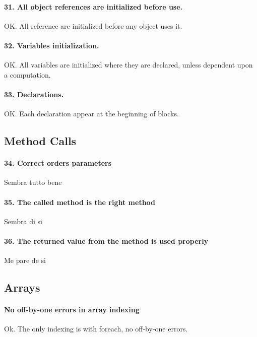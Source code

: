 \documentclass[english]{article}
\begin{document}
\paragraph{31. All object references are initialized before use.} 
OK. All reference are initialized before any object uses it. 

\paragraph{32. Variables initialization.} 
OK. All variables are initialized where they are declared, unless dependent upon a computation.

\paragraph{33. Declarations.} OK. Each declaration appear at the beginning of blocks.

\subsection{Method Calls}

\paragraph{34. Correct orders parameters}

Sembra tutto bene

\paragraph{35. The called method is the right method}

Sembra di si

\paragraph{36. The returned value from the method is used properly}

Me pare de si


\subsection{Arrays}
\paragraph{No off-by-one errors in array indexing}
Ok.
The only indexing is with foreach, no off-by-one errors.
\end{document}
